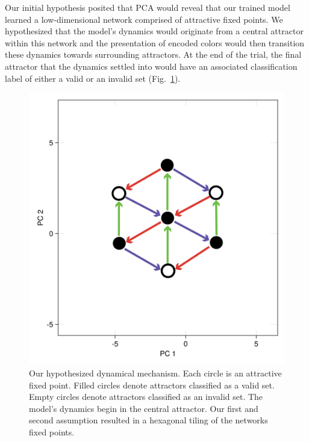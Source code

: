 \documentclass[conference]{IEEEtran}
\begin{document}
Our initial hypothesis posited that PCA would reveal that our trained model learned a low-dimensional network comprised of attractive fixed points. We hypothesized that the model's dynamics would originate from a central attractor within this network and the presentation of encoded colors would then transition these dynamics towards surrounding attractors. At the end of the trial, the final attractor that the dynamics settled into would have an associated classification label of either a valid or an invalid set (Fig.~\ref{hypothesisFSA}).

\begin{figure}[htbp]
\centerline{\includegraphics[scale=0.15]{hypothesis.png}}
\caption{Our hypothesized dynamical mechanism. Each circle is an attractive fixed point. Filled circles denote attractors classified as a valid set. Empty circles denote attractors classified as an invalid set. The model's dynamics begin in the central attractor. Our first and second assumption resulted in a hexagonal tiling of the networks fixed points.}
\label{hypothesisFSA}
\end{figure}
\end{document}
